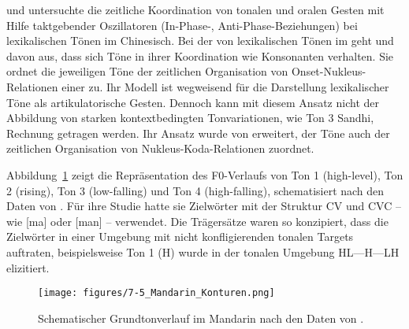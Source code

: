 \citet{Gao2006} und \citet{Gao2009} untersuchte die zeitliche Koordination von tonalen und oralen Gesten mit Hilfe taktgebender Oszillatoren (In-Phase-, Anti-Phase-Beziehungen) bei lexikalischen Tönen im  Chinesisch. Bei der  von lexikalischen Tönen im  geht \citet{Gao2006} und \citet{Gao2009} davon aus, dass sich Töne in ihrer Koordination wie Konsonanten verhalten. Sie ordnet die jeweiligen Töne der zeitlichen Organisation von Onset-Nukleus-Relationen einer  zu. Ihr Modell ist wegweisend für die Darstellung lexikalischer Töne als artikulatorische Gesten. Dennoch kann mit diesem Ansatz nicht der Abbildung von starken kontextbedingten Tonvariationen, wie Ton 3 Sandhi, Rechnung getragen werden. Ihr Ansatz wurde von \citet{Hsieh2011} erweitert, der Töne auch der zeitlichen Organisation von Nukleus-Koda-Relationen zuordnet.

Abbildung~\ref{figure:0705} zeigt die Repräsentation des F0-Verlaufs von Ton 1 (high-level), Ton 2 (rising), Ton 3 (low-falling) und Ton 4 (high-falling), schematisiert nach den Daten von \citet{Gao2009}. Für ihre Studie hatte sie Zielwörter mit der Struktur CV und CVC -- wie [ma] oder [man] -- verwendet. Die Trägersätze waren so konzipiert, dass die Zielwörter in einer Umgebung mit nicht konfligierenden tonalen Targets auftraten, beispielsweise Ton 1 (H) wurde in der tonalen Umgebung HL---H---LH elizitiert.

\begin{figure}[p]
	\texttt{[image: figures/7-5\_Mandarin\_Konturen.png]}
	\caption{Schematischer Grundtonverlauf im Mandarin nach den Daten von \citet{Gao2009}.}
	\label{figure:0705}
\end{figure}

